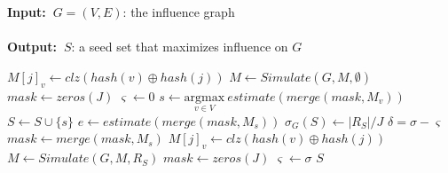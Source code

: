 \documentclass[10pt,journal,compsoc]{IEEEtran}
\renewcommand{\algorithmicrequire}{\textbf{Input:~}}
\renewcommand{\algorithmicensure}{\textbf{Output:~}}
\begin{document}
\begin{algorithm}
\caption{($G,K,J$)}
\label{algo:main}
\algorithmicrequire{$G = (V,E)$: the influence graph
\\\\}
\algorithmicensure{$S$: a seed set that maximizes influence on $G$
}
\begin{algorithmic}[1]
            \State $M[j]_v \leftarrow clz(hash(v) \oplus hash(j))$ 
        \EndFor
    \EndFor
    \State $M \leftarrow Simulate(G,M,\emptyset)$
    \State $mask \leftarrow zeros(J)$
    \State $\varsigma \leftarrow 0$
        \State $s \leftarrow \underset{v\in V}{\mathrm{argmax}} ~estimate(merge(mask,M_v))$
        \State $S \leftarrow S \cup \{s\}$
        \State $e \leftarrow estimate(merge(mask,M_s))$
        \State $\sigma_G(S) \leftarrow |R_S|/J$
        \State $\delta = \sigma - \varsigma$
            \State $mask \leftarrow merge(mask,M_s)$
        \Else
                    \State $M[j]_v \leftarrow clz(hash(v) \oplus hash(j))$ 
                \EndFor
            \EndFor
            \State $M \leftarrow Simulate(G,M,R_S)$
            \State $mask \leftarrow zeros(J) $ 
            \State $\varsigma \leftarrow \sigma $ 
        \EndIf
    \EndFor
    \State \Return $S$
\end{algorithmic}
\end{algorithm}
\end{document}
